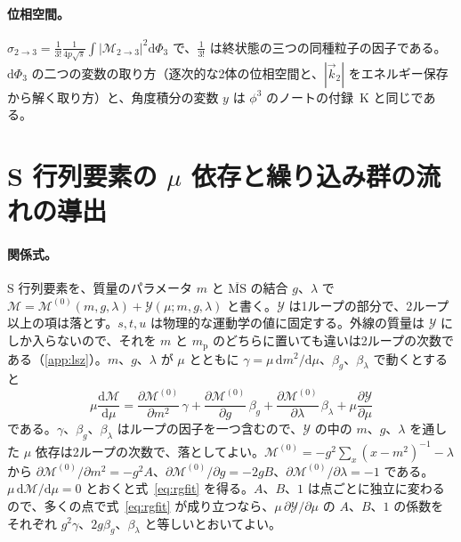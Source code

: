 \documentclass[a4paper,10pt]{ltjsarticle}
\newcommand{\dd}{\mathrm{d}}
\begin{document}
\paragraph{位相空間。}$\sigma_{2\to3}=\frac{1}{3!}\frac{1}{4p\sqrt s}\int|\mathcal{M}_{2\to3}|^2\dd\Phi_3$ で、$\frac{1}{3!}$ は終状態の三つの同種粒子の因子である。$\dd\Phi_3$ の二つの変数の取り方（逐次的な2体の位相空間と、$|\vec k_2|$ をエネルギー保存から解く取り方）と、角度積分の変数 $y$ は $\phi^3$ のノートの付録~K と同じである。

\section{S 行列要素の $\mu$ 依存と繰り込み群の流れの導出}\label{app:rgfit}

\paragraph{関係式。}S 行列要素を、質量のパラメータ $m$ と $\overline{\mathrm{MS}}$ の結合 $g$、$\lambda$ で $\mathcal{M}=\mathcal{M}^{(0)}(m,g,\lambda)+\mathcal{Y}(\mu;m,g,\lambda)$ と書く。$\mathcal{Y}$ は1ループの部分で、2ループ以上の項は落とす。$s,t,u$ は物理的な運動学の値に固定する。外線の質量は $\mathcal{Y}$ にしか入らないので、それを $m$ と $m_{\mathrm p}$ のどちらに置いても違いは2ループの次数である（\ref{app:lsz}）。$m$、$g$、$\lambda$ が $\mu$ とともに $\gamma=\mu\,\dd m^2/\dd\mu$、$\beta_g$、$\beta_\lambda$ で動くとすると
\begin{equation*}
\mu\frac{\dd\mathcal{M}}{\dd\mu}=\frac{\partial\mathcal{M}^{(0)}}{\partial m^2}\,\gamma+\frac{\partial\mathcal{M}^{(0)}}{\partial g}\,\beta_g+\frac{\partial\mathcal{M}^{(0)}}{\partial\lambda}\,\beta_\lambda+\mu\frac{\partial \mathcal{Y}}{\partial\mu}
\end{equation*}
である。$\gamma$、$\beta_g$、$\beta_\lambda$ はループの因子を一つ含むので、$\mathcal{Y}$ の中の $m$、$g$、$\lambda$ を通した $\mu$ 依存は2ループの次数で、落としてよい。$\mathcal{M}^{(0)}=-g^2\sum_x(x-m^2)^{-1}-\lambda$ から $\partial\mathcal{M}^{(0)}/\partial m^2=-g^2A$、$\partial\mathcal{M}^{(0)}/\partial g=-2gB$、$\partial\mathcal{M}^{(0)}/\partial\lambda=-1$ である。$\mu\,\dd\mathcal{M}/\dd\mu=0$ とおくと式~\eqref{eq:rgfit} を得る。$A$、$B$、$1$ は点ごとに独立に変わるので、多くの点で式~\eqref{eq:rgfit} が成り立つなら、$\mu\,\partial \mathcal{Y}/\partial\mu$ の $A$、$B$、$1$ の係数をそれぞれ $g^2\gamma$、$2g\beta_g$、$\beta_\lambda$ と等しいとおいてよい。
\end{document}
